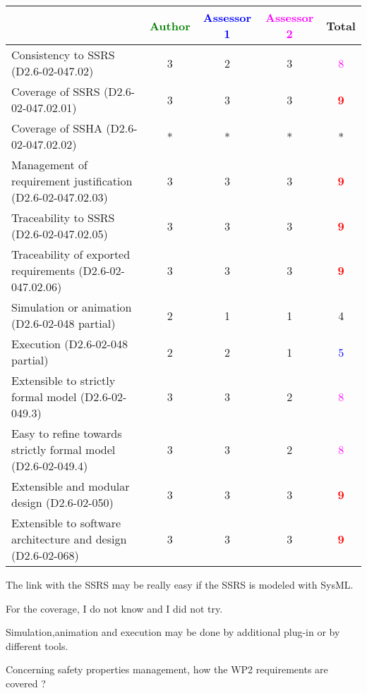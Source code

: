 \begin{tabular}{|l | c | c | c | c|}
\hline
& \textcolor{green}{Author} & \textcolor{blue}{Assessor 1} & \textcolor{magenta}{Assessor 2} & Total \\
\hline 
Consistency to SSRS (D2.6-02-047.02) &3 &2 & 3    & \textcolor{magenta}{8} \\
\hline
Coverage of SSRS (D2.6-02-047.02.01)  &3 & 3    & 3    & \textcolor{red}{\textbf{9}} \\
\hline
Coverage of SSHA (D2.6-02-047.02.02)  & * & *& *& * \\
\hline
Management of requirement justification (D2.6-02-047.02.03)  &3 & 3    & 3    & \textcolor{red}{\textbf{9}} \\
\hline
Traceability to  SSRS (D2.6-02-047.02.05)  & 3     & 3    & 3    & \textcolor{red}{\textbf{9}} \\
\hline
Traceability of exported requirements (D2.6-02-047.02.06)  &3 & 3    & 3    & \textcolor{red}{\textbf{9}} \\
\hline
Simulation or animation (D2.6-02-048 partial)  &2 & 1    & 1    & 4      \\
\hline
Execution (D2.6-02-048 partial)  &2 & 2    & 1    & \textcolor{blue}{5} \\
\hline
Extensible to strictly formal model (D2.6-02-049.3) &3 & 3    & 2    & \textcolor{magenta}{8} \\
\hline
Easy to  refine towards strictly formal model (D2.6-02-049.4) &3 & 3    & 2    & \textcolor{magenta}{8} \\
\hline
Extensible and modular design (D2.6-02-050)  &3 & 3    & 3    & \textcolor{red}{\textbf{9}} \\
\hline
Extensible to software architecture and design (D2.6-02-068)   &3 & 3    & 3    & \textcolor{red}{\textbf{9}} \\
\hline
\end{tabular}
\begin{author_comment}
The link with the SSRS may be really easy if the SSRS is modeled
with SysML.

For the coverage, I do not know and I did not try.


Simulation,animation  and execution may be done by additional plug-in
or by different tools.
\end{author_comment}
Concerning safety properties management, how the WP2 requirements are covered ?

